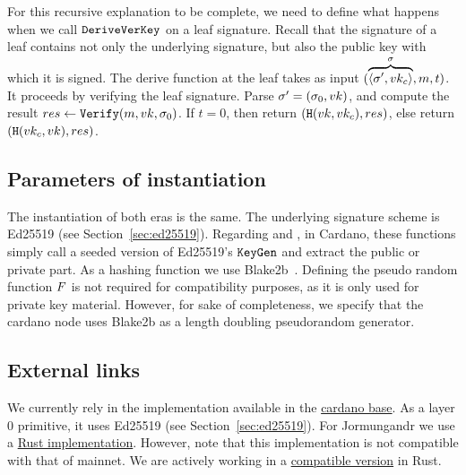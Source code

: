 For this recursive explanation to be complete, we need to define what happens when we call $\texttt{DeriveVerKey}$ on a leaf
signature. Recall that the signature of a leaf contains not only the underlying signature, but also the public key
with which it is signed. The derive function at the leaf takes as input
$(\overbrace{\langle\sigma', vk_c\rangle}^{\sigma}, m, t)$. It proceeds by verifying the leaf signature.
Parse $\sigma' = (\sigma_0, vk)$, and compute the result $res\gets\texttt{Verify}(m, vk, \sigma_0)$. If $t = 0$, then
return $(\texttt{H}(vk, vk_c), res)$, else return $(\texttt{H}(vk_c, vk), res)$.

\subsection{Parameters of instantiation}
\label{sec:kes:params}
The instantiation of both eras is the same. The underlying signature scheme is Ed25519 (see Section~\ref{sec:ed25519}).
Regarding \pkeygen and \skeygen, in Cardano,
these functions simply call a seeded version of Ed25519's $\texttt{KeyGen}$ and extract the public or private part. As a hashing
function we use Blake2b~\cite{blake2b}. Defining the pseudo random function $F$ is not required for compatibility
purposes, as it is only used for private key material. However, for sake of completeness, we specify that the cardano
node uses Blake2b as a length doubling pseudorandom generator.
\subsection{External links}
We currently rely in the implementation available in the \href{https://github
.com/input-output-hk/cardano-base/tree/master/cardano-crypto-class/src/Cardano/Crypto/KES}{cardano base}. As a layer
0 primitive, it uses Ed25519 (see Section~\ref{sec:ed25519}). For Jormungandr we use a \href{https://github
.com/input-output-hk/chain-libs/tree/master/chain-crypto/src/algorithms/sumed25519}{Rust implementation}. However,
note that this implementation is not compatible with that of mainnet. We are actively working in a
\href{https://github.com/input-output-hk/kes-mmm-sumed25519/tree/crate_review}{compatible version} in Rust.

